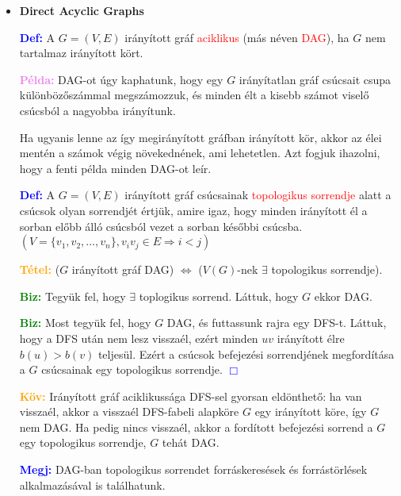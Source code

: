 \documentclass[../../szobeli.tex]{subfiles}
\begin{document}
\begin{itemize}
        \item \textbf{Direct Acyclic Graphs}

        \textcolor{blue}{\textbf{Def:}} A $G = (V,E)$ irányított gráf \textcolor{red}{aciklikus} (más néven \textcolor{red}{DAG}), ha $G$ nem tartalmaz irányított kört.

        \textcolor{violet}{\textbf{Példa:}} DAG-ot úgy kaphatunk, hogy egy $G$ irányítatlan gráf csúcsait csupa különbözőszámmal megszámozzuk, és minden élt a kisebb számot viselő csúcsból a nagyobba irányítunk.

        Ha ugyanis lenne az így megirányított gráfban irányított kör, akkor az élei mentén a számok végig növekednének, ami lehetetlen. Azt fogjuk ihazolni, hogy a fenti példa minden DAG-ot leír.

        \textcolor{blue}{\textbf{Def:}} A $G = (V,E)$ irányított gráf csúcsainak \textcolor{red}{topologikus sorrendje} alatt a csúcsok olyan sorrendjét értjük, amire igaz, hogy minden irányított él a sorban előbb álló csúcsból vezet a sorban későbbi csúcsba. $(V=\{v_1,v_2,\dots,v_n\},v_iv_j \in E \Rightarrow i < j)$

        \textcolor{orange}{\textbf{Tétel:}} ($G$ irányított gráf DAG) $\Leftrightarrow$ ($V(G)$-nek $\exists$ topologikus sorrendje).

        \textcolor{green}{\textbf{Biz:}} Tegyük fel, hogy $\exists$ toplogikus sorrend. Láttuk, hogy $G$ ekkor DAG. \checkmark

        \textcolor{green}{\textbf{Biz:}} Most tegyük fel, hogy $G$ DAG, és futtassunk rajra egy DFS-t. Láttuk, hogy a DFS után nem lesz visszaél, ezért minden $uv$ irányított élre $b(u) > b(v)$ teljesül. Ezért a csúcsok befejezési sorrendjének megfordítása a $G$ csúcsainak egy topologikus sorrendje.  \textcolor{blue}{$\Box$} 

        \textcolor{orange}{\textbf{Köv:}} Irányított gráf aciklikussága DFS-sel gyorsan eldönthető: ha van visszaél, akkor a visszaél DFS-fabeli alapköre $G$ egy irányított köre, így $G$ nem DAG. Ha pedig nincs visszaél, akkor a fordított befejezési sorrend a $G$ egy topologikus sorrendje, $G$ tehát DAG.

        \textcolor{blue}{\textbf{Megj:}} DAG-ban topologikus sorrendet forráskeresések és forrástörlések alkalmazásával is találhatunk.

    \end{itemize}
\end{document}
